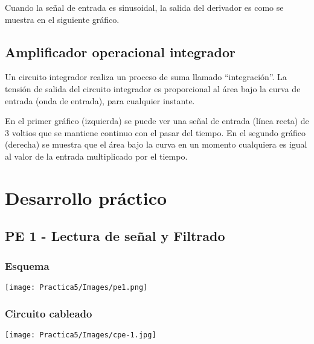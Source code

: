 \documentclass[12pt]{article}
\begin{document}
        Cuando la señal de entrada es sinusoidal, la salida del derivador es como se muestra en el siguiente gráfico.
        
        \begin{figure}[h!]
                \centering
            \end{figure}
            
        \subsection{Amplificador operacional integrador}
        Un circuito integrador realiza un proceso de suma llamado “integración”. La tensión de salida del circuito integrador es proporcional al área bajo la curva de entrada (onda de entrada), para cualquier instante.
        
        En el primer gráfico (izquierda) se puede ver una señal de entrada (línea recta) de 3 voltios que se mantiene continuo con el pasar del tiempo. En el segundo gráfico (derecha) se muestra que el área bajo la curva en un momento cualquiera es igual al valor de la entrada multiplicado por el tiempo. 
        
        \begin{figure}[h!]
                \centering
            \end{figure}



    \newpage
    \section{Desarrollo práctico}
        
        \subsection{PE 1 - Lectura de señal y Filtrado}
            \begin{multicols}{2}
                \subsubsection{Esquema}
                    \texttt{[image: Practica5/Images/pe1.png]}
            
            \columnbreak
            
                \subsubsection{Circuito cableado}
                    \texttt{[image: Practica5/Images/cpe-1.jpg]}
            \end{multicols}
            
\end{document}
